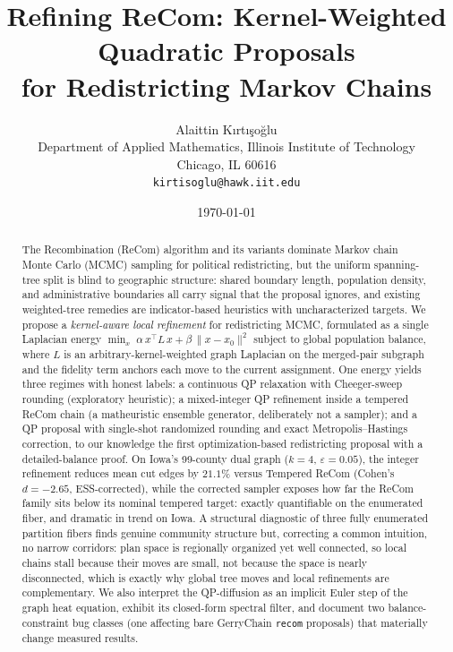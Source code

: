 \documentclass[11pt]{article}
\title{Refining ReCom: Kernel-Weighted Quadratic Proposals\\
       for Redistricting Markov Chains}
\author{Alaittin K\i rt\i \c{s}o\u{g}lu \\
        \small Department of Applied Mathematics, Illinois Institute of Technology \\
        \small Chicago, IL 60616 \\
        \small \texttt{kirtisoglu@hawk.iit.edu}}
\date{\today}
\begin{document}
\maketitle

\begin{abstract}
The Recombination (ReCom) algorithm and its variants dominate Markov
chain Monte Carlo (MCMC) sampling for political redistricting, but the
uniform spanning-tree split is blind to geographic structure: shared
boundary length, population density, and administrative boundaries all
carry signal that the proposal ignores, and existing weighted-tree
remedies are indicator-based heuristics with uncharacterized targets.
We propose a \emph{kernel-aware local refinement} for redistricting
MCMC, formulated as a single Laplacian energy
\(
  \min_{x}\; \alpha\, x^\top L\, x + \beta\, \|x - x_0\|^2
\)
subject to global population balance, where $L$ is an
arbitrary-kernel-weighted graph Laplacian on the merged-pair subgraph
and the fidelity term anchors each move to the current assignment.
One energy yields three regimes with honest labels: a continuous QP
relaxation with Cheeger-sweep rounding (exploratory heuristic); a
mixed-integer QP refinement inside a tempered ReCom chain (a
matheuristic ensemble generator, deliberately not a sampler); and a
QP proposal with single-shot randomized rounding and exact
Metropolis--Hastings correction, to our knowledge the first
optimization-based redistricting proposal with a detailed-balance
proof. On Iowa's 99-county dual graph ($k = 4$,
$\varepsilon = 0.05$), the integer refinement reduces mean cut edges
by $21.1\%$ versus Tempered ReCom (Cohen's $d = -2.65$,
ESS-corrected), while the corrected sampler exposes how far the
ReCom family sits below its nominal tempered target: exactly
quantifiable on the enumerated fiber, and dramatic in trend on Iowa.
A structural diagnostic of three fully enumerated partition fibers
finds genuine community structure but, correcting a common intuition,
no narrow corridors: plan space is regionally organized yet well
connected, so local chains stall because their moves are small, not
because the space is nearly disconnected, which is exactly why global
tree moves and local refinements are complementary.
We also interpret the QP-diffusion as an implicit Euler step of the
graph heat equation, exhibit its closed-form spectral filter, and
document two balance-constraint bug classes (one affecting bare
GerryChain \texttt{recom} proposals) that materially change measured
results.
\end{abstract}
\end{document}

